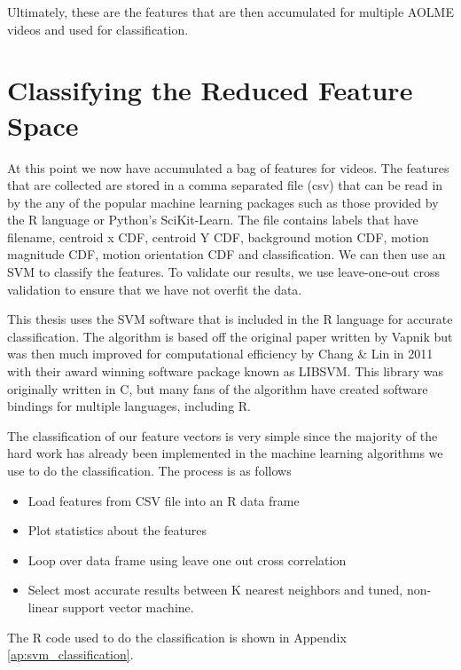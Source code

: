 Ultimately, these are the features that are then accumulated for multiple AOLME
videos and used for classification.

\section{\label{section:classification}Classifying the Reduced Feature Space}
At this point we now have accumulated a bag of features for videos. The features
that are collected are stored in a comma separated file (csv) that can be read
in by the any of the popular machine learning packages such as those provided
by the R language or Python's SciKit-Learn. The file contains labels that have
filename, centroid x CDF, centroid Y CDF, background motion CDF, motion magnitude
CDF, motion orientation CDF and classification. We can then use an SVM to classify
the features. To validate our results, we use leave-one-out cross validation
to ensure that we have not overfit the data.

This thesis uses the SVM software that is included in the R language for
accurate classification. The algorithm is based off the original paper written
by Vapnik \cite{cortes1995support} but was then much improved for computational
efficiency by Chang \& Lin in 2011 \cite{chang2011libsvm} with their award
winning software package known as LIBSVM. This library was originally written
in C, but many fans of the algorithm have created software bindings for multiple
languages, including R.

The classification of our feature vectors is very simple since the majority of
the hard work has already been implemented in the machine learning algorithms
we use to do the classification. The process is as follows


\begin{itemize}
  \item Load features from CSV file into an R data frame
  \item Plot statistics about the features
  \item Loop over data frame using leave one out cross correlation
  \item Select most accurate results between K nearest neighbors and tuned, non-linear
  support vector machine.
\end{itemize}

The R code used to do the classification is shown in Appendix
\ref{ap:svm_classification}.
